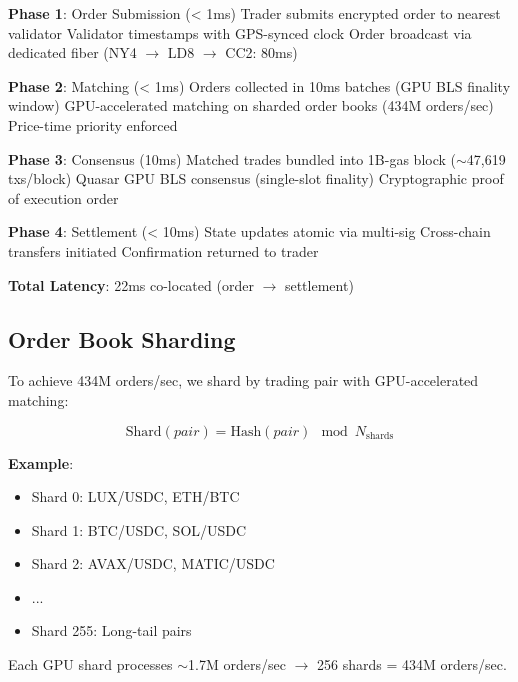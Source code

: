 \begin{algorithm}
\caption{Lightspeed Order Execution}
\begin{algorithmic}
\STATE \textbf{Phase 1}: Order Submission (< 1ms)
\STATE Trader submits encrypted order to nearest validator
\STATE Validator timestamps with GPS-synced clock
\STATE Order broadcast via dedicated fiber (NY4 $\to$ LD8 $\to$ CC2: 80ms)

\STATE \textbf{Phase 2}: Matching (< 1ms)
\STATE Orders collected in 10ms batches (GPU BLS finality window)
\STATE GPU-accelerated matching on sharded order books (434M orders/sec)
\STATE Price-time priority enforced

\STATE \textbf{Phase 3}: Consensus (10ms)
\STATE Matched trades bundled into 1B-gas block ($\sim$47,619 txs/block)
\STATE Quasar GPU BLS consensus (single-slot finality)
\STATE Cryptographic proof of execution order

\STATE \textbf{Phase 4}: Settlement (< 10ms)
\STATE State updates atomic via multi-sig
\STATE Cross-chain transfers initiated
\STATE Confirmation returned to trader

\STATE \textbf{Total Latency}: 22ms co-located (order $\to$ settlement)
\end{algorithmic}
\end{algorithm}

\subsection{Order Book Sharding}

To achieve 434M orders/sec, we shard by trading pair with GPU-accelerated matching:

\begin{equation}
\text{Shard}(pair) = \text{Hash}(pair) \mod N_{\text{shards}}
\end{equation}

\textbf{Example}:
\begin{itemize}
    \item Shard 0: LUX/USDC, ETH/BTC
    \item Shard 1: BTC/USDC, SOL/USDC
    \item Shard 2: AVAX/USDC, MATIC/USDC
    \item ...
    \item Shard 255: Long-tail pairs
\end{itemize}

Each GPU shard processes $\sim$1.7M orders/sec $\to$ 256 shards = 434M orders/sec.


